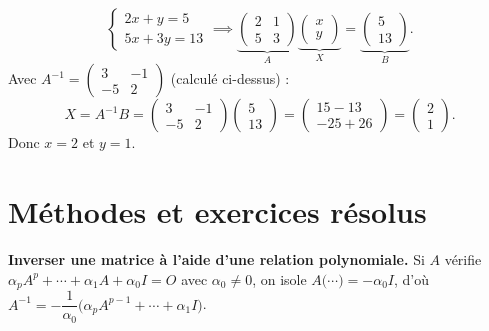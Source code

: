 \begin{exemple}
	\[
	\begin{cases} 2x + y = 5 \\ 5x + 3y = 13 \end{cases}
	\implies
	\underbrace{\begin{pmatrix}2&1\\5&3\end{pmatrix}}_{A}
	\underbrace{\begin{pmatrix}x\\y\end{pmatrix}}_{X}
	=
	\underbrace{\begin{pmatrix}5\\13\end{pmatrix}}_{B}.
	\]
	Avec $A^{-1}=\begin{pmatrix}3&-1\\-5&2\end{pmatrix}$ (calculé ci-dessus) :
	\[
	X = A^{-1}B = \begin{pmatrix}3&-1\\-5&2\end{pmatrix}\begin{pmatrix}5\\13\end{pmatrix}
	= \begin{pmatrix}15-13\\-25+26\end{pmatrix}
	= \begin{pmatrix}2\\1\end{pmatrix}.
	\]
	Donc $x=2$ et $y=1$.
\end{exemple}


\section{Méthodes et exercices résolus}

\begin{methode}
	\textbf{Inverser une matrice à l'aide d'une relation polynomiale.}
	Si $A$ vérifie $\alpha_p A^p + \cdots + \alpha_1 A + \alpha_0 I = O$ avec
	$\alpha_0 \neq 0$, on isole $A\bigl(\cdots\bigr) = -\alpha_0 I$, d'où
	$A^{-1} = -\dfrac{1}{\alpha_0}\bigl(\alpha_p A^{p-1} + \cdots + \alpha_1 I\bigr)$.
\end{methode}

